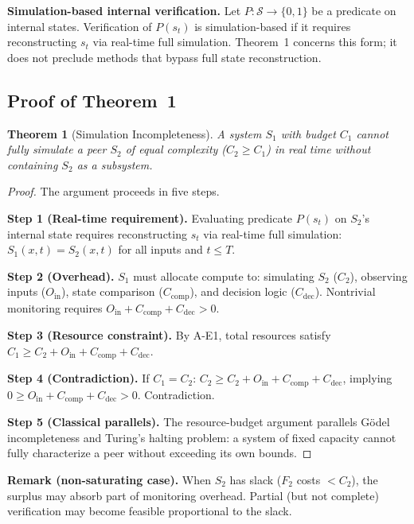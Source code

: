 \documentclass[11pt]{article}
\newtheorem{theorem}{Theorem}
\begin{document}
\textbf{Simulation-based internal verification.} Let $P: \mathcal{S} \to \{0,1\}$ be a predicate on internal states. Verification of $P(s_t)$ is simulation-based if it requires reconstructing $s_t$ via real-time full simulation. Theorem~1 concerns this form; it does not preclude methods that bypass full state reconstruction.

\subsection{Proof of Theorem~1}
\label{sec:S6.2}

\begin{theorem}[Simulation Incompleteness]
A system $S_1$ with budget $C_1$ cannot fully simulate a peer $S_2$ of equal complexity ($C_2 \geq C_1$) in real time without containing $S_2$ as a subsystem.
\end{theorem}

\begin{proof}
The argument proceeds in five steps.

\textbf{Step 1 (Real-time requirement).} Evaluating predicate $P(s_t)$ on $S_2$'s internal state requires reconstructing $s_t$ via real-time full simulation: $S_1(x, t) = S_2(x, t)$ for all inputs and $t \leq T$.

\textbf{Step 2 (Overhead).} $S_1$ must allocate compute to: simulating $S_2$ ($C_2$), observing inputs ($O_{\text{in}}$), state comparison ($C_{\text{comp}}$), and decision logic ($C_{\text{dec}}$). Nontrivial monitoring requires $O_{\text{in}} + C_{\text{comp}} + C_{\text{dec}} > 0$.

\textbf{Step 3 (Resource constraint).} By A-E1, total resources satisfy $C_1 \geq C_2 + O_{\text{in}} + C_{\text{comp}} + C_{\text{dec}}$.

\textbf{Step 4 (Contradiction).} If $C_1 = C_2$: $C_2 \geq C_2 + O_{\text{in}} + C_{\text{comp}} + C_{\text{dec}}$, implying $0 \geq O_{\text{in}} + C_{\text{comp}} + C_{\text{dec}} > 0$. Contradiction.

\textbf{Step 5 (Classical parallels).} The resource-budget argument parallels G\"odel incompleteness and Turing's halting problem: a system of fixed capacity cannot fully characterize a peer without exceeding its own bounds.
\end{proof}

\textbf{Remark (non-saturating case).} When $S_2$ has slack ($F_2$ costs $< C_2$), the surplus may absorb part of monitoring overhead. Partial (but not complete) verification may become feasible proportional to the slack.
\end{document}
